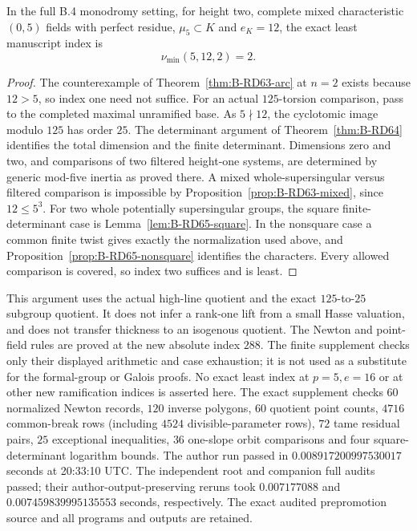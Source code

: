 \begin{theorem}
\label{thm:B-RD65}
In the full B.4 monodromy setting, for height two, complete mixed
characteristic $(0,5)$ fields with perfect residue, $\mu_5\subset K$
and $e_K=12$, the exact least manuscript index is
\[
                           \nu_{\min}(5,12,2)=2.       \tag{B-RD65.8}
\]
\end{theorem}
\begin{proof}
The counterexample of Theorem~\ref{thm:B-RD63-arc} at $n=2$
exists because $12>5$, so index one need not suffice.
For an actual $125$-torsion comparison, pass to the completed
maximal unramified base. As $5\nmid12$, the cyclotomic image
modulo $125$ has order $25$. The determinant argument of
Theorem~\ref{thm:B-RD64} identifies the total dimension and the
finite determinant. Dimensions zero and two, and comparisons of
two filtered height-one systems, are determined by generic
mod-five inertia as proved there. A mixed whole-supersingular
versus filtered comparison is impossible by
Proposition~\ref{prop:B-RD63-mixed}, since $12\le5^3$.
For two whole potentially supersingular groups, the square
finite-determinant case is Lemma~\ref{lem:B-RD65-square}.
In the nonsquare case a common finite twist gives exactly the
normalization used above, and Proposition~\ref{prop:B-RD65-nonsquare}
identifies the characters. Every allowed comparison is covered,
so index two suffices and is least.
\end{proof}

\begin{remark}
\label{rem:B-RD65-scope}
This argument uses the actual high-line quotient and the exact
$125$-to-$25$ subgroup quotient. It does not infer a rank-one lift
from a small Hasse valuation, and does not transfer thickness to
an isogenous quotient. The Newton and point-field rules are proved
at the new absolute index $288$. The finite supplement checks
only their displayed arithmetic and case exhaustion; it is not
used as a substitute for the formal-group or Galois proofs.
No exact least index at $p=5,e=16$ or at other new ramification
indices is asserted here.
The exact supplement
checks $60$ normalized Newton records, $120$ inverse polygons,
$60$ quotient point counts, $4716$ common-break rows (including
$4524$ divisible-parameter rows), $72$ tame residual pairs,
$25$ exceptional inequalities, $36$ one-slope orbit comparisons
and four square-determinant logarithm bounds. The author run passed
in $0.008917200997530017$ seconds at 20:33:10 UTC.
The independent root and companion full audits passed; their
author-output-preserving reruns took $0.007177088$ and
$0.007459839995135553$ seconds, respectively. The exact audited
prepromotion source and all programs and outputs are retained.
\end{remark}
